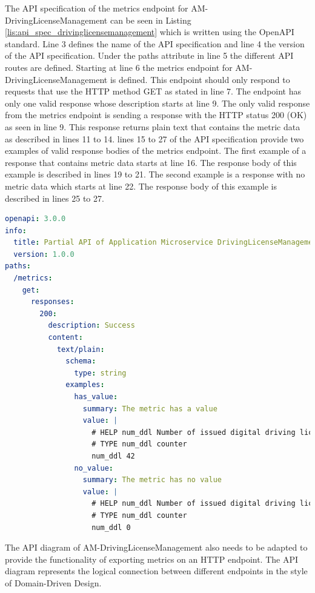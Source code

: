 The API specification of the metrics endpoint for AM-DrivingLicenseManagement can be seen in Listing
\ref{lis:api_spec_drivinglicensemanagement} which is written using the OpenAPI
standard. Line 3 defines the name of the API specification and line 4 the version of the API specification.
Under the paths attribute in line 5 the different API routes are defined.
Starting at line 6 the metrics endpoint for AM-DrivingLicenseManagement is defined.
This endpoint should only respond to requests that use the HTTP method GET as stated in line 7.
The endpoint has only one valid response whose description starts at line 9.
The only valid response from the metrics endpoint is sending a response with the HTTP status 200 (OK) as seen in line 9.
This response returns plain text that contains the metric data as described in lines 11 to 14.
lines 15 to 27 of the API specification provide two examples of valid response bodies of the metrics endpoint.
The first example of a response that contains metric data starts at line 16. The response body of this example
is described in lines 19 to 21. The second example is a response with no metric data which starts at line 22.
The response body of this example is described in lines 25 to 27.

\begin{lstlisting}[caption = {Partial API Specification of Application Microservice DrivingLicenseManagement}, label = {lis:api_spec_drivinglicensemanagement}, style = kit-cm, language=yaml]
openapi: 3.0.0
info:
  title: Partial API of Application Microservice DrivingLicenseManagement
  version: 1.0.0
paths:
  /metrics:
    get:
      responses:
        200:
          description: Success
          content:
            text/plain:
              schema:
                type: string
              examples:
                has_value: 
                  summary: The metric has a value
                  value: |
                    # HELP num_ddl Number of issued digital driving licenses
                    # TYPE num_ddl counter
                    num_ddl 42
                no_value: 
                  summary: The metric has no value
                  value: |
                    # HELP num_ddl Number of issued digital driving licenses
                    # TYPE num_ddl counter
                    num_ddl 0
\end{lstlisting}

The API diagram of AM-DrivingLicenseManagement also
needs to be adapted to provide the functionality of exporting metrics on an
HTTP endpoint. The API diagram represents the logical connection between
different endpoints in the style of Domain-Driven Design.

